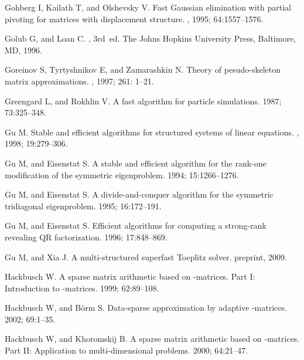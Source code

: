 \documentclass[times]{nlaauth}
\newcounter{algorithm}
\begin{document}
\begin{thebibliography}{99}
{  Gohberg I, Kailath T, and Olshevsky V.}
\newblock Fast {Gaussian} elimination with partial pivoting for matrices with
  displacement structure.
, 1995; 64:1557--1576.

{  Golub G, and Loan C.}
, 3rd~ed.
\newblock The Johns Hopkins University Press, Baltimore, MD, 1996.

{Goreinov S, Tyrtyshnikov E, and Zamarashkin N.}
\newblock Theory of pesudo-skeleton matrix approximations.
, 1997; 261: 1--21.

{  Greengard L, and Rokhlin V.}
\newblock A fast algorithm for particle simulations.
 1987;  73:325--348.

{  Gu M.}
\newblock Stable and efficient algorithms for structured systems of linear
  equations.
, 1998; 19:279--306.

{  Gu M, and Eisenstat S.}
\newblock A stable and efficient algorithm for the rank-one modification of the
  symmetric eigenproblem.
 1994;  15:1266--1276.

{  Gu M, and Eisenstat S.}
\newblock A divide-and-conquer algorithm for the symmetric tridiagonal
  eigenproblem.
 1995;  16:172--191.

{  Gu M, and Eisenstat S.}
\newblock Efficient algorithms for computing a strong-rank revealing {QR}
  factorization.
 1996; 17:848--869.

{  Gu M, and Xia J.}
\newblock A multi-structured superfast {Toeplitz} solver.
\newblock preprint, 2009.

{  Hackbusch W.}
\newblock A sparse matrix arithmetic based on -matrices. {Part I}:
  Introduction to -matrices.
 1999; 62:89--108.

{  Hackbusch W, and B\"{o}rm S.}
\newblock Data-sparse approximation by adaptive -matrices.
 2002; 69:1--35.

{  Hackbusch W, and Khoromskij B.}
\newblock A sparse matrix arithmetic based on -matrices. {Part
  II}: Application to multi-dimensional problems.
 2000; 64:21--47.


\end{thebibliography}
\end{document}
